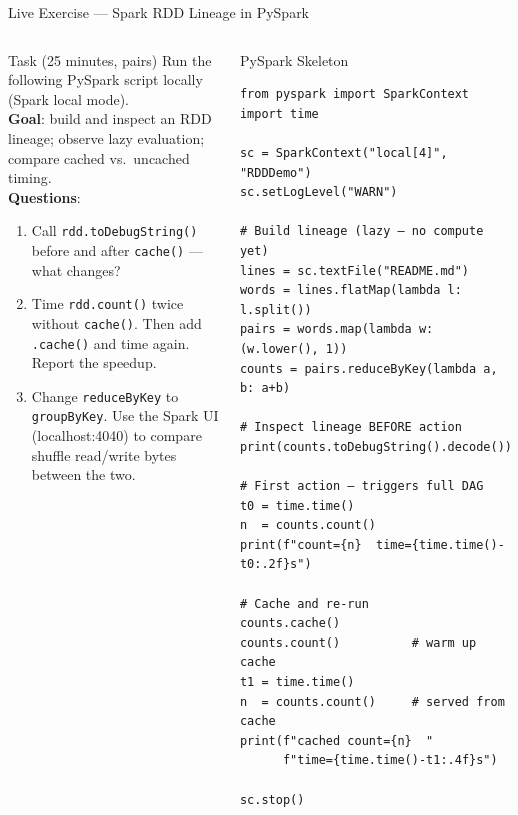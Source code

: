 \documentclass[aspectratio=169,10pt]{beamer}
\begin{document}
\begin{frame}[fragile]{Live Exercise — Spark RDD Lineage in PySpark}
  \begin{columns}[T]
      \begin{block}{Task (25 minutes, pairs)}
        Run the following PySpark script locally (Spark local mode).\\[5pt]
        \textbf{Goal}: build and inspect an RDD lineage;
        observe lazy evaluation; compare cached vs.\ uncached timing.\\[5pt]
        \textbf{Questions}:
        \begin{enumerate}\setlength\itemsep{1pt}
          \item Call \texttt{rdd.toDebugString()} before and after
                \texttt{cache()} — what changes?
          \item Time \texttt{rdd.count()} twice without \texttt{cache()}.
                Then add \texttt{.cache()} and time again.
                Report the speedup.
          \item Change \texttt{reduceByKey} to \texttt{groupByKey}.
                Use the Spark UI (localhost:4040) to compare
                shuffle read/write bytes between the two.
        \end{enumerate}
      \end{block}

      \begin{exampleblock}{PySpark Skeleton}
        \scriptsize
        \begin{verbatim}
from pyspark import SparkContext
import time

sc = SparkContext("local[4]", "RDDDemo")
sc.setLogLevel("WARN")

# Build lineage (lazy — no compute yet)
lines = sc.textFile("README.md")
words = lines.flatMap(lambda l: l.split())
pairs = words.map(lambda w: (w.lower(), 1))
counts = pairs.reduceByKey(lambda a, b: a+b)

# Inspect lineage BEFORE action
print(counts.toDebugString().decode())

# First action — triggers full DAG
t0 = time.time()
n  = counts.count()
print(f"count={n}  time={time.time()-t0:.2f}s")

# Cache and re-run
counts.cache()
counts.count()          # warm up cache
t1 = time.time()
n  = counts.count()     # served from cache
print(f"cached count={n}  "
      f"time={time.time()-t1:.4f}s")

sc.stop()
        \end{verbatim}
      \end{exampleblock}
  \end{columns}
\end{frame}
\end{document}
